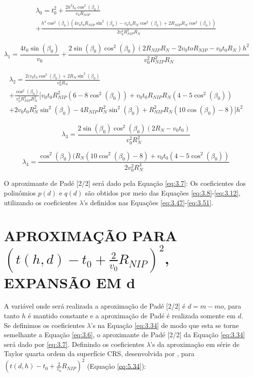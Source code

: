 {%
\begin{multline}
\label{eq:6.47}
 \lambda_0=t_0^2+\frac{2h^2t_0\cos^2(\beta_0)}{v_0R_{NIP}} \\
 +\frac{h^4\cos^2(\beta_0)(4v_0t_0R_{NIP}\sin^2(\beta_0)-v_0t_0R_N\cos^2(\beta_0)+2R_{NIP}R_N\cos^2(\beta_0))}{2v_0^2R_{NIP}^3R_N}
 \end{multline}
 
\begin{equation}
\label{eq:6.48}
 \lambda_1=\frac{4t_0\sin(\beta_0)}{v_0}+\frac{2\sin(\beta_0)\cos^2(\beta_0)(2R_{NIP}R_N-2v_0toR_{NIP}-v_0t_0R_N)h^2}{v_0^2R_{NIP}^2R_N}
\end{equation}

\begin{multline}
\label{eq:6.49}
\lambda_2=\frac{2(v_0t_0\cos^2(\beta_0)+2R_N\sin^2(\beta_0)}{v_0^2R_N} \\
+\frac{\cos^2(\beta_0)}{v_0^2R_{NIP}^3R_N^2}[v_0t_0R_{NIP}^2(6-8\cos^2(\beta_0))+v_0t_0R_{NIP}R_N(4-5\cos^2(\beta_0)) \\
+2v_0t_0R_N^2\sin^2(\beta_0)-4R_{NIP}R_N^2\sin^2(\beta_0)+R_{NIP}^2R_N(10\cos(\beta_0)-8)]h^2
\end{multline}

\begin{equation}
\label{eq:6.50}
\lambda_3=\frac{2\sin(\beta_0)\cos^2(\beta_0)(2R_N-v_0t_0)}{v_0^2R_N^2}
\end{equation}

\begin{equation}
\label{eq:6.51}
\lambda_4=\frac{\cos^2(\beta_0)(R_N(10\cos^2(\beta_0)-8)+v_0t_0(4-5\cos^2(\beta_0))}{2v_0^2R_N^3}
\end{equation}

O aproximante de Padé [2/2] será dado pela Equação \ref{eq:3.7}:
Os coeficientes dos polinômios $p(d)$ e $q(d)$ são obtidos por meio das Equações \ref{eq:3.8}-\ref{eq:3.12},
utilizando os coeficientes $\lambda$'s definidos nas Equações \ref{eq:3.47}-\ref{eq:3.51}.

\section{APROXIMAÇÃO PARA $(t(h,d)-t_0+\frac{2}{v_0}R_{NIP})^2$, EXPANSÃO EM d}
\label{sec:6.6}
A variável onde será realizada a aproximação de Padé [2/2] é $d=m-mo$, 
para tanto $h$ é mantido constante e a aproximação de Padé é realizada somente em $d$.
Se definimos os coeficientes $\lambda$'s na Equação \ref{eq:3.34} de modo que esta se torne semelhante 
a Equação \ref{eq:3.6},
o aproximante de Padé [2/2] da Equação \ref{eq:3.34} será dado por \ref{eq:3.7}.
Definindo os coeficientes $\lambda$'s da aproximação em série de Taylor quarta ordem da superfície CRS, 
desenvolvida por \cite{germam}, para $(t(d,h)-t_0+\frac{2}{v_0}R_{NIP})^2$ (Equação \ref{eq:5.34}):

}
